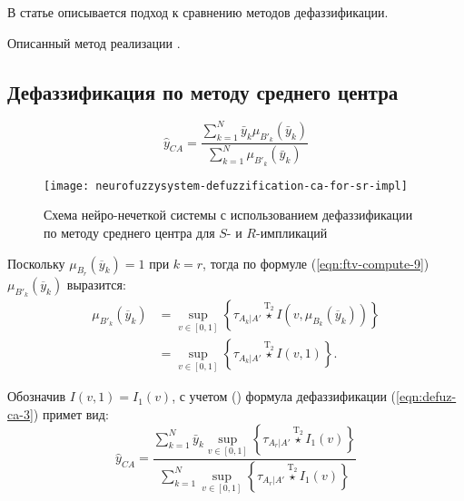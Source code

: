 В статье \cite{VanLeekwijck1999} описывается подход к сравнению методов дефаззификации.

Описанный метод реализации \cite{eisele1994}.

\subsection{Дефаззификация по методу среднего центра}


\begin{equation*}
	\label{eqn:defuz-ca-1}
	\hat{y}_{CA} = \frac{\sum_{k=1}^{N} \bar{y}_k \mu_{B'_k}(\bar{y}_k)}{\sum_{k=1}^{N} \mu_{B'_k}(\bar{y}_k)}
\end{equation*}

\begin{figure}[ht]
	\centering
	\texttt{[image: neurofuzzysystem-defuzzification-ca-for-sr-impl]}
	\caption{Схема нейро-нечеткой системы с использованием дефаззификации по методу среднего центра для $S$- и $R$-импликаций}
	\label{fig:neurofuzzysystem-defuzzification-ca-for-sr-impl}
\end{figure}

Поскольку $\mu_{B_r}(\overline{y}_k) = 1$ при $k = r$, тогда по формуле (\ref{eqn:ftv-compute-9}) $\mu_{B'_k}(\overline{y}_k)$ выразится:
\begin{align}
	\label{eqn:defuz-ca-3}
	\mu_{B'_k}(\overline{y}_k) &= \sup_{v\in [0, 1]} \left\{\tau_{A_k|A'}\overset{\mathrm{T}_2}{\star} I\left(v, \mu_{B_k}(\overline{y}_k)\right)\right\}\\ &= \sup_{v\in [0, 1]} \left\{\tau_{A_k|A'}\overset{\mathrm{T}_2}{\star} I\left(v, 1\right)\right\}.
\end{align}

Обозначив $I(v, 1) = I_1(v)$, с учетом () формула дефаззификации (\ref{eqn:defuz-ca-3}) примет вид:
\begin{equation}
	\label{eqn:defuz-ca-4}
	\hat{y}_{CA} = \frac{\sum_{k=1}^{N} \bar{y}_k \sup_{v\in [0, 1]} \left\{\tau_{A_r|A'}\overset{\mathrm{T}_2}{\star} I_1(v) \right\}}{\sum_{k=1}^{N} \sup_{v\in [0, 1]} \left\{\tau_{A_r|A'}\overset{\mathrm{T}_2}{\star} I_1(v) \right\}}
\end{equation}

